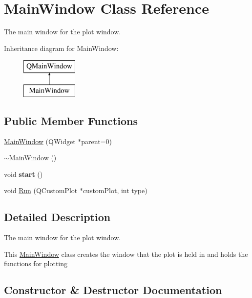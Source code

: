\hypertarget{classMainWindow}{}\section{Main\+Window Class Reference}
\label{classMainWindow}


The main window for the plot window.  


Inheritance diagram for Main\+Window\+:\begin{figure}[H]
\begin{center}
\leavevmode
\includegraphics[height=2.000000cm]{classMainWindow}
\end{center}
\end{figure}
\subsection*{Public Member Functions}
\begin{DoxyCompactItemize}
\item 
\hyperlink{classMainWindow_a8b244be8b7b7db1b08de2a2acb9409db}{Main\+Window} (Q\+Widget $\ast$parent=0)
\item 
\hyperlink{classMainWindow_ae98d00a93bc118200eeef9f9bba1dba7}{$\sim$\+Main\+Window} ()
\item 
void {\bfseries start} ()\hypertarget{classMainWindow_a5edcbc314e782645cdf4db101eeb247d}{}\label{classMainWindow_a5edcbc314e782645cdf4db101eeb247d}

\item 
void \hyperlink{classMainWindow_abee37ce669b29d49855fcf5fb76536df}{Run} (Q\+Custom\+Plot $\ast$custom\+Plot, int type)
\end{DoxyCompactItemize}


\subsection{Detailed Description}
The main window for the plot window. 

This \hyperlink{classMainWindow}{Main\+Window} class creates the window that the plot is held in and holds the functions for plotting 

\subsection{Constructor \& Destructor Documentation}
